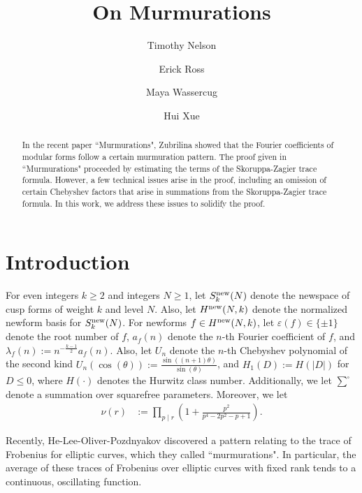 \documentclass[12pt,letterpaper,reqno]{amsart}
\author[T. Nelson]{Timothy Nelson}
\author[E. Ross]{Erick Ross}
\author[M. Wassercug]{Maya Wassercug}
\author[H. Xue]{Hui Xue}
\title{On Murmurations}
\theoremstyle{plain}
\theoremstyle{definition}
\numberwithin{equation}{section}
\numberwithin{figure}{section}
\numberwithin{table}{section}
\newcommand{\lrp}[1]{\!\left(#1\right)}
\newcommand{\new}{{\rm new}}
\begin{document}
\begin{abstract}
    In the recent paper ``Murmurations", Zubrilina showed that the Fourier coefficients of modular forms follow a certain murmuration pattern. The proof given in ``Murmurations" proceeded by estimating the terms of the Skoruppa-Zagier trace formula. However, a few technical issues arise in the proof, including an omission of certain Chebyshev factors that arise in summations from the Skoruppa-Zagier trace formula. In this work, we address these issues to solidify the proof.
\end{abstract}

\maketitle


\tableofcontents





\section{Introduction}
For even integers $k \ge 2$ and integers $N \ge 1$, let $S_k^\new(N)$ denote the newspace of cusp forms of weight $k$ and level $N$. Also, let $H^\new (N ,k)$ denote the normalized newform basis for $S_k^\new(N)$. For newforms $f \in H^\new(N,k)$, let $\varepsilon(f)\in \{\pm 1\}$ denote the root number of $f$, $a_f(n)$ denote the $n$-th Fourier coefficient of $f$, and $\lambda_f(n) := n^{-\frac{k-1}{2}}  a_f(n)$. 
Also, let $U_{n}$ denote the $n$-th Chebyshev polynomial of the second kind $U_n(\cos (\theta)) := \frac{\sin((n+1)\theta)}{\sin (\theta)}$, and $H_1(D) := H(|D|)$ for $D \le 0$, where $H(\cdot)$ denotes the Hurwitz class number.
Additionally, we let $\sum^\square$ denote a summation over squarefree parameters.
Moreover, we let
\begin{align}
    \nu(r) &:= \prod_{p\mid r}\lrp{1+\frac{p^2}{p^4-2p^2-p+1}}.
\end{align}


Recently, He-Lee-Oliver-Pozdnyakov \cite{He-Lee-Oliver-Pozdnyakov} discovered a pattern relating to the trace of Frobenius for elliptic curves, which they called ``murmurations". In particular, the average of these traces of Frobenius over elliptic curves with fixed rank tends to a continuous, oscillating function. 
\end{document}
